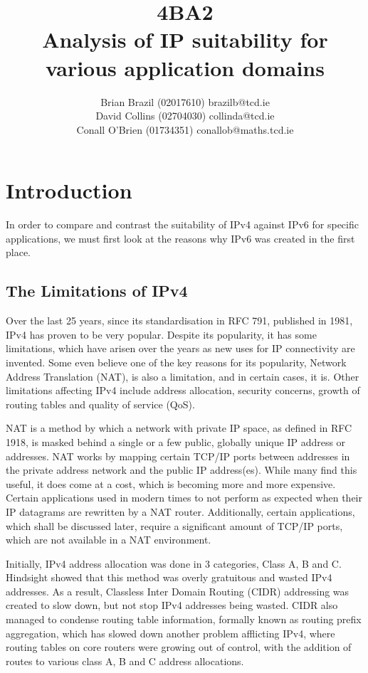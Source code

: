\documentclass[a4paper,12pt]{article}
\begin{document}
\title{4BA2 \\ Analysis of IP suitability for various application domains}

\author{Brian Brazil (02017610) brazilb@tcd.ie \\
David Collins (02704030) collinda@tcd.ie \\ 
Conall O'Brien (01734351) conallob@maths.tcd.ie}

\maketitle

\section{Introduction}

In order to compare and contrast the suitability of IPv4 against IPv6
for specific applications, we must first look at the reasons why IPv6
was created in the first place.

\subsection{The Limitations of IPv4}

Over the last 25 years, since its standardisation in RFC 791, published
in 1981, IPv4 has proven to be very popular. Despite its popularity, it 
has some limitations, which have arisen over the years as new uses for 
IP connectivity are invented. Some even believe one of the key reasons
for its popularity, Network Address Translation (NAT), is also a 
limitation, and in certain cases, it is. Other limitations
affecting IPv4 include address allocation, security concerns, growth of 
routing tables and quality of service (QoS).


NAT is a method by which a network with private IP space, as defined in
RFC 1918, is masked behind a single or a few public, globally unique IP
address or addresses. NAT works by mapping certain TCP/IP ports between
addresses in the private address network and the public IP address(es).
While many find this useful, it does come at a cost, which is becoming
more and more expensive. Certain applications used in modern times to
not perform as expected when their IP datagrams are rewritten by a NAT
router. Additionally, certain applications, which shall be discussed
later, require a significant amount of TCP/IP ports, which are not
available in a NAT environment.


Initially, IPv4 address allocation was done in 3 categories, Class A, B
and C. Hindsight showed that this method was overly gratuitous and
wasted IPv4 addresses. As a result, Classless Inter Domain Routing
(CIDR) addressing was created to slow down, but not stop IPv4 addresses
being wasted. CIDR also managed to condense routing table information,
formally known as routing prefix aggregation, which has slowed down 
another problem afflicting IPv4, where routing tables on core
routers were growing out of control, with the addition of routes to
various class A, B and C address allocations.
\end{document}
